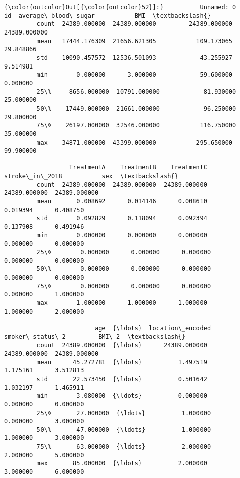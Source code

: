 \documentclass[11pt]{article}
\begin{document}
\begin{Verbatim}[commandchars=\\\{\}]
{\color{outcolor}Out[{\color{outcolor}52}]:}          Unnamed: 0            id  average\_blood\_sugar           BMI  \textbackslash{}
         count  24389.000000  24389.000000         24389.000000  24389.000000   
         mean   17444.176309  21656.621305           109.173065     29.848866   
         std    10090.457572  12536.501093            43.255927      9.514981   
         min        0.000000      3.000000            59.600000      0.000000   
         25\%     8656.000000  10791.000000            81.930000     25.000000   
         50\%    17449.000000  21661.000000            96.250000     29.800000   
         75\%    26197.000000  32546.000000           116.750000     35.000000   
         max    34871.000000  43399.000000           295.650000     99.900000   
         
                  TreatmentA    TreatmentB    TreatmentC  stroke\_in\_2018           sex  \textbackslash{}
         count  24389.000000  24389.000000  24389.000000    24389.000000  24389.000000   
         mean       0.008692      0.014146      0.008610        0.019394      0.408750   
         std        0.092829      0.118094      0.092394        0.137908      0.491946   
         min        0.000000      0.000000      0.000000        0.000000      0.000000   
         25\%        0.000000      0.000000      0.000000        0.000000      0.000000   
         50\%        0.000000      0.000000      0.000000        0.000000      0.000000   
         75\%        0.000000      0.000000      0.000000        0.000000      1.000000   
         max        1.000000      1.000000      1.000000        1.000000      2.000000   
         
                         age  {\ldots}  location\_encoded  smoker\_status\_2         BMI\_2  \textbackslash{}
         count  24389.000000  {\ldots}      24389.000000     24389.000000  24389.000000   
         mean      45.272781  {\ldots}          1.497519         1.175161      3.512813   
         std       22.573450  {\ldots}          0.501642         1.032197      1.465911   
         min        3.080000  {\ldots}          0.000000         0.000000      0.000000   
         25\%       27.000000  {\ldots}          1.000000         0.000000      3.000000   
         50\%       47.000000  {\ldots}          1.000000         1.000000      3.000000   
         75\%       63.000000  {\ldots}          2.000000         2.000000      5.000000   
         max       85.000000  {\ldots}          2.000000         3.000000      6.000000   
         

\end{Verbatim}
\end{document}
